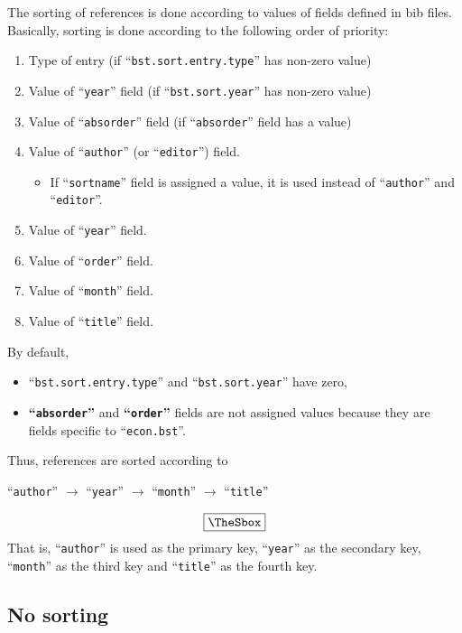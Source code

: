 \documentclass[10pt]{article}
\newenvironment{Frame}%
{\setlength{\fboxsep}{15pt}
\setlength{\mylength}{\linewidth}%
\addtolength{\mylength}{-2\fboxsep}%
\addtolength{\mylength}{-2\fboxrule}%
\Sbox
\minipage{\mylength}%
\setlength{\abovedisplayskip}{0pt}%
\setlength{\belowdisplayskip}{0pt}%
}%
{\endminipage\endSbox
\[\fbox{\TheSbox}\]}
\begin{document}
The sorting of references is done according to values of fields defined
in bib files.  Basically, sorting is done according to the following
order of priority:
\begin{enumerate}
 \item Type of entry (if ``\texttt{bst.sort.entry.type}'' has non-zero value)
 \item Value of ``\texttt{year}'' field (if ``\texttt{bst.sort.year}'' has non-zero value)
 \item Value of ``\texttt{absorder}'' field (if ``\texttt{absorder}'' field has
       a value)
 \item Value of ``\texttt{author}'' (or ``\texttt{editor}'') field.
       \begin{itemize}
        \item If ``\texttt{sortname}'' field is assigned a value, it is used
              instead of ``\texttt{author}'' and ``\texttt{editor}''.
       \end{itemize}
 \item Value of ``\texttt{year}'' field.
 \item Value of ``\texttt{order}'' field.
 \item Value of ``\texttt{month}'' field.
 \item Value of ``\texttt{title}'' field.
\end{enumerate}

By default, 
\begin{itemize}
 \item ``\texttt{bst.sort.entry.type}'' and ``\texttt{bst.sort.year}'' have
       zero,
 \item \textbf{``\texttt{absorder}''} and \textbf{``\texttt{order}''}
       fields are not assigned values because they are fields specific
       to ``\texttt{econ.bst}''.
\end{itemize}
Thus, references are sorted according to
\begin{Frame}
 \begin{center}
 ``\texttt{author}'' $\rightarrow$ ``\texttt{year}'' $\rightarrow$
 ``\texttt{month}'' $\rightarrow$  ``\texttt{title}'' 
\end{center}
\end{Frame}
That is, ``\texttt{author}'' is used as the primary key, ``\texttt{year}'' as
the secondary key, ``\texttt{month}'' as the third key and ``\texttt{title}'' as
the fourth key.

\subsection{No sorting}
\end{document}

